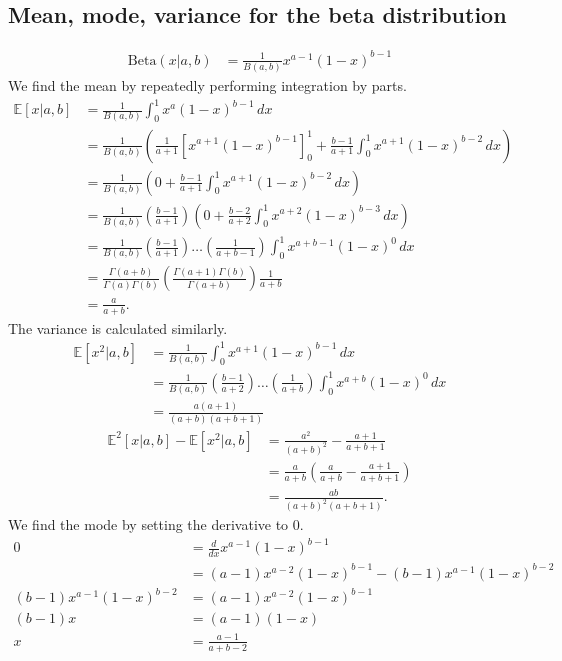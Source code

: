 \documentclass{article}
\begin{document}
\subsection{Mean, mode, variance for the beta distribution}
\begin{align*}
\mathrm{Beta}(x|a,b) &= \frac{1}{B(a,b)} x^{a-1} (1-x)^{b-1}
\end{align*}
We find the mean by repeatedly performing integration by parts.
\begin{align*}
\mathbb{E}[x|a,b] &= \frac{1}{B(a,b)} \int_{0}^{1} x^{a} (1-x)^{b-1} \,dx\\
&= \frac{1}{B(a,b)} \left( \frac{1}{a+1} \left[ x^{a+1} (1-x)^{b-1} \right]_{0}^{1} + \frac{b-1}{a+1} \int_{0}^{1} x^{a+1} (1-x)^{b-2} \,dx \right)\\
&= \frac{1}{B(a,b)} \left( 0 + \frac{b-1}{a+1} \int_{0}^{1} x^{a+1} (1-x)^{b-2} \,dx \right)\\
&= \frac{1}{B(a,b)} \left( \frac{b-1}{a+1} \right) \left( 0 + \frac{b-2}{a+2} \int_{0}^{1} x^{a+2} (1-x)^{b-3} \,dx \right)\\
&= \frac{1}{B(a,b)} \left( \frac{b-1}{a+1} \right) \dots \left( \frac{1}{a+b-1} \right) \int_{0}^{1} x^{a+b-1} (1-x)^{0} \,dx\\
&= \frac{\Gamma(a+b)}{\Gamma(a)\Gamma(b)} \left( \frac{\Gamma(a+1)\Gamma(b)}{\Gamma(a+b)} \right) \frac{1}{a+b}\\
&= \frac{a}{a+b}.
\end{align*}
The variance is calculated similarly.
\begin{align*}
\mathbb{E}[x^2|a,b] &= \frac{1}{B(a,b)} \int_{0}^{1} x^{a+1} (1-x)^{b-1} \,dx\\
&= \frac{1}{B(a,b)} \left( \frac{b-1}{a+2} \right) \dots \left( \frac{1}{a+b} \right) \int_{0}^{1} x^{a+b} (1-x)^{0} \,dx\\
&= \frac{a(a+1)}{(a+b)(a+b+1)}
\end{align*}
\begin{align*}
\mathbb{E}^2[x|a,b] - \mathbb{E}[x^2|a,b] &= \frac{a^2}{(a+b)^2} - \frac{a+1}{a+b+1}\\
&= \frac{a}{a+b}\left( \frac{a}{a+b} - \frac{a+1}{a+b+1} \right)\\
&= \frac{ab}{(a+b)^2(a+b+1)}.
\end{align*}
We find the mode by setting the derivative to 0.
\begin{align*}
0 &= \frac{d}{dx} x^{a-1}(1-x)^{b-1}\\
&= (a-1)x^{a-2}(1-x)^{b-1} - (b-1)x^{a-1}(1-x)^{b-2}\\
(b-1)x^{a-1}(1-x)^{b-2} &= (a-1)x^{a-2}(1-x)^{b-1}\\
(b-1)x &= (a-1)(1-x)\\
x &= \frac{a-1}{a+b-2}
\end{align*}
\end{document}
